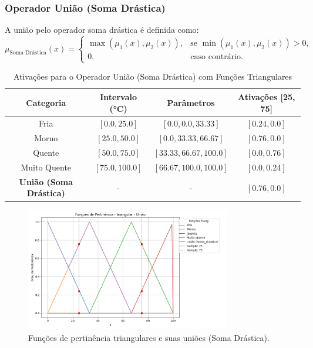 \documentclass[a4paper,12pt]{article}
\begin{document}
\subsubsection{Operador União (Soma Drástica)}

A união pelo operador soma drástica é definida como:
\[
\mu_{\text{Soma Drástica}}(x) =
\begin{cases}
\max(\mu_1(x), \mu_2(x)), & \text{se } \min(\mu_1(x), \mu_2(x)) > 0, \\
0, & \text{caso contrário.}
\end{cases}
\]

\begin{table}[H]
\centering
\caption{Ativações para o Operador União (Soma Drástica) com Funções Triangulares}
\begin{tabular}{|c|c|c|c|}
\hline
\textbf{Categoria}    & \textbf{Intervalo (°C)} & \textbf{Parâmetros}       & \textbf{Ativações [25, 75]} \\ \hline
Fria                  & $[0.0, 25.0]$          & $[0.0, 0.0, 33.33]$       & $[0.24, 0.0]$              \\ \hline
Morno                 & $[25.0, 50.0]$         & $[0.0, 33.33, 66.67]$     & $[0.76, 0.0]$              \\ \hline
Quente                & $[50.0, 75.0]$         & $[33.33, 66.67, 100.0]$   & $[0.0, 0.76]$              \\ \hline
Muito Quente          & $[75.0, 100.0]$        & $[66.67, 100.0, 100.0]$   & $[0.0, 0.24]$              \\ \hline
\textbf{União (Soma Drástica)} & -            & -                         & $[0.76, 0.0]$             \\ \hline
\end{tabular}
\end{table}

\begin{figure}[H]
    \centering
    \includegraphics[width=0.8\textwidth]{img/funções_de_pertinência_triangular_união_fuzzificado.png}
    \caption{Funções de pertinência triangulares e suas uniões (Soma Drástica).}
    \label{fig:uniao_soma_drastica_triangular}
\end{figure}
\end{document}

